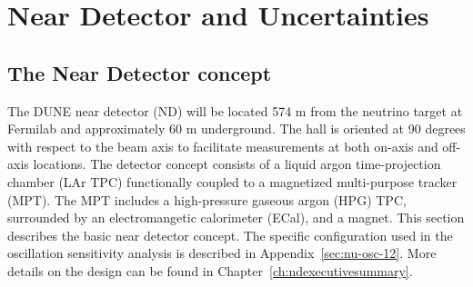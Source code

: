 \section{Near Detector and Uncertainties}\label{sec:nu-osc-06}\label{sec:physics-lbnosc-ND}





\subsection{The Near Detector concept}
\label{sec:ndconcept}

The DUNE near detector (ND) will be located 574 m from the neutrino target at Fermilab and approximately 60 m underground. The hall is oriented at 90 degrees with respect to the beam axis to facilitate measurements at both on-axis and off-axis locations. The detector concept consists of a liquid argon time-projection chamber (LAr TPC) functionally coupled to a magnetized multi-purpose tracker (MPT). The MPT includes a high-pressure gaseous argon (HPG) TPC, surrounded by an electromangetic calorimeter (ECal), and a magnet. This section describes the basic near detector concept. The specific configuration used in the oscillation sensitivity analysis is described in Appendix~\ref{sec:nu-osc-12}. More details on the design can be found in Chapter~\ref{ch:ndexecutivesummary}.


